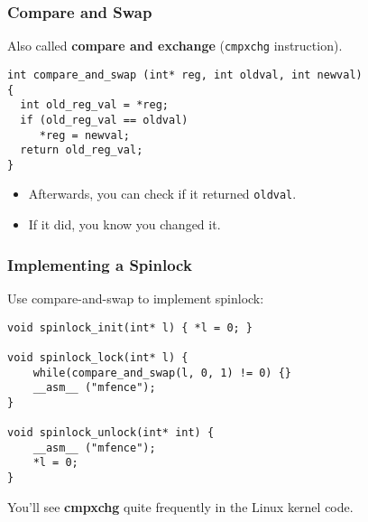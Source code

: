 \documentclass[aspectratio=43]{beamer}
\newenvironment{changemargin}[1]{%
  \begin{list}{}{%
    \setlength{\topsep}{0pt}%
    \setlength{\leftmargin}{#1}%
    \setlength{\rightmargin}{1em}
    \setlength{\listparindent}{\parindent}%
    \setlength{\itemindent}{\parindent}%
    \setlength{\parsep}{\parskip}%
  }%
  \item[]}{\end{list}}
\begin{document}
\begin{frame}[fragile]
  \frametitle{Compare and Swap}

  \begin{changemargin}{1.5cm}
  Also called {\bf compare and exchange} ({\tt cmpxchg} instruction).

  \begin{lstlisting}
int compare_and_swap (int* reg, int oldval, int newval) 
{
  int old_reg_val = *reg;
  if (old_reg_val == oldval) 
     *reg = newval;
  return old_reg_val;
}
  \end{lstlisting}

  \begin{itemize}
    \item Afterwards, you can check if it returned {\tt oldval}.
    \item If it did, you know you changed it.
  \end{itemize}
  \end{changemargin}
\end{frame}

\begin{frame}[fragile]
  \frametitle{Implementing a Spinlock}

  \begin{changemargin}{1.5cm}
  Use compare-and-swap to implement spinlock:
  \begin{lstlisting}
void spinlock_init(int* l) { *l = 0; }

void spinlock_lock(int* l) {
    while(compare_and_swap(l, 0, 1) != 0) {}
    __asm__ ("mfence");
}

void spinlock_unlock(int* int) {
    __asm__ ("mfence");
    *l = 0;  
}
  \end{lstlisting}
  You'll see {\bf cmpxchg} quite frequently in the Linux kernel code.
  \end{changemargin}
\end{frame}
\end{document}
